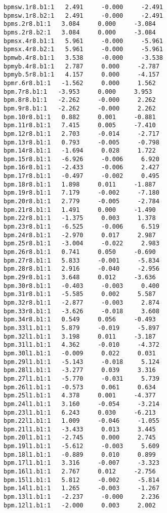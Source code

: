 \begin{verbatim}
bpmsw.1r8.b1:1   2.491     -0.000     -2.491
bpmsw.1r8.b2:1   2.491     -0.000     -2.491
bpms.2r8.b1:1   3.084     0.000     -3.084
bpms.2r8.b2:1   3.084     0.000     -3.084
bpmsx.4r8.b1:1   5.961     -0.000     -5.961
bpmsx.4r8.b2:1   5.961     -0.000     -5.961
bpmwb.4r8.b1:1   3.538     -0.000     -3.538
bpmyb.4r8.b1:1   2.787     0.000     -2.787
bpmyb.5r8.b1:1   4.157     0.000     -4.157
bpmr.6r8.b1:1   -1.562     0.000     1.562
bpm.7r8.b1:1   -3.953     0.000     3.953
bpm.8r8.b1:1   -2.262     -0.000     2.262
bpm.9r8.b1:1   -2.262     -0.000     2.262
bpm.10r8.b1:1   0.882     0.001     -0.881
bpm.11r8.b1:1   7.415     0.005     -7.410
bpm.12r8.b1:1   2.703     -0.014     -2.717
bpm.13r8.b1:1   0.793     -0.005     -0.798
bpm.14r8.b1:1   -1.694     0.028     1.722
bpm.15r8.b1:1   -6.926     -0.006     6.920
bpm.16r8.b1:1   -2.433     -0.006     2.427
bpm.17r8.b1:1   -0.497     -0.002     0.495
bpm.18r8.b1:1   1.898     0.011     -1.887
bpm.19r8.b1:1   7.179     -0.002     -7.180
bpm.20r8.b1:1   2.779     -0.005     -2.784
bpm.21r8.b1:1   1.491     0.000     -1.490
bpm.22r8.b1:1   -1.375     0.003     1.378
bpm.23r8.b1:1   -6.525     -0.006     6.519
bpm.24r8.b1:1   -2.970     0.017     2.987
bpm.25r8.b1:1   -3.004     -0.022     2.983
bpm.26r8.b1:1   0.741     0.050     -0.690
bpm.27r8.b1:1   5.833     -0.001     -5.834
bpm.28r8.b1:1   2.916     -0.040     -2.956
bpm.29r8.b1:1   3.648     0.012     -3.636
bpm.30r8.b1:1   -0.403     -0.003     0.400
bpm.31r8.b1:1   -5.585     0.002     5.587
bpm.32r8.b1:1   -2.877     -0.003     2.874
bpm.33r8.b1:1   -3.626     -0.018     3.608
bpm.34r8.b1:1   0.549     0.056     -0.493
bpm.33l1.b1:1   5.879     -0.019     -5.897
bpm.32l1.b1:1   3.198     0.011     -3.187
bpm.31l1.b1:1   4.362     -0.010     -4.372
bpm.30l1.b1:1   -0.009     0.022     0.031
bpm.29l1.b1:1   -5.143     -0.018     5.124
bpm.28l1.b1:1   -3.277     0.039     3.316
bpm.27l1.b1:1   -5.770     -0.031     5.739
bpm.26l1.b1:1   -0.573     0.061     0.634
bpm.25l1.b1:1   4.378     0.001     -4.377
bpm.24l1.b1:1   3.160     -0.054     -3.214
bpm.23l1.b1:1   6.243     0.030     -6.213
bpm.22l1.b1:1   1.009     -0.046     -1.055
bpm.21l1.b1:1   -3.433     0.013     3.445
bpm.20l1.b1:1   -2.745     0.000     2.745
bpm.19l1.b1:1   -5.612     -0.003     5.609
bpm.18l1.b1:1   -0.889     0.010     0.899
bpm.17l1.b1:1   3.316     -0.007     -3.323
bpm.16l1.b1:1   2.767     0.012     -2.756
bpm.15l1.b1:1   5.812     -0.002     -5.814
bpm.14l1.b1:1   1.265     -0.003     -1.267
bpm.13l1.b1:1   -2.237     -0.000     2.236
bpm.12l1.b1:1   -2.000     0.003     2.002

\end{verbatim}
